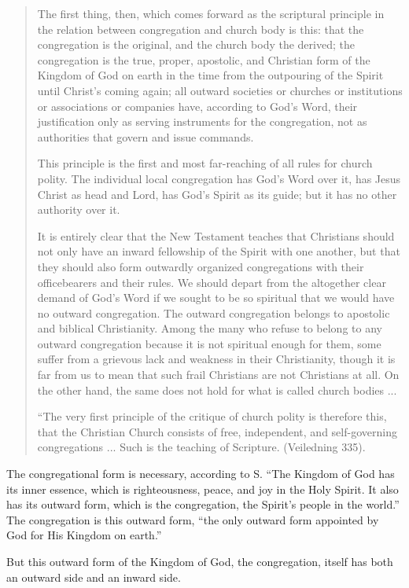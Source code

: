 \begin{quote}
The first thing, then, which comes forward as the scriptural principle in the relation between congregation and church body is this: that the congregation is the original, and the church body the derived; the congregation is the true, proper, apostolic, and Christian form of the Kingdom of God on earth in the time from the outpouring of the Spirit until Christ’s coming again; all outward societies or churches or institutions or associations or companies have, according to God’s Word, their justification only as serving instruments for the congregation, not as authorities that govern and issue commands.

This principle is the first and most far-reaching of all rules for church polity. The individual local congregation has God’s Word over it, has Jesus Christ as head and Lord, has God’s Spirit as its guide; but it has no other authority over it.

It is entirely clear that the New Testament teaches that Christians should not only have an inward fellowship of the Spirit with one another, but that they should also form outwardly organized congregations with their officebearers and their rules. We should depart from the altogether clear demand of God’s Word if we sought to be so spiritual that we would have no outward congregation. The outward congregation belongs to apostolic and biblical Christianity. Among the many who refuse to belong to any outward congregation because it is not spiritual enough for them, some suffer from a grievous lack and weakness in their Christianity, though it is far from us to mean that such frail Christians are not Christians at all. On the other hand, the same does not hold for what is called church bodies ...

“The very first principle of the critique of church polity is therefore this, that the Christian Church consists of free, independent, and self-governing congregations ... Such is the teaching of Scripture. (Veiledning 335).

\end{quote}

The congregational form is necessary, according to S. “The Kingdom of God has its inner essence, which is righteousness, peace, and joy in the Holy Spirit. It also has its outward form, which is the congregation, the Spirit’s people in the world.” The congregation is this outward form, “the only outward form appointed by God for His Kingdom on earth.”

But this outward form of the Kingdom of God, the congregation, itself has both an outward side and an inward side.

